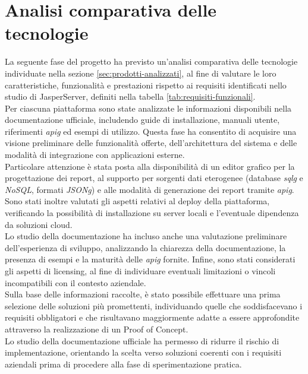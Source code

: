 \section{Analisi comparativa delle tecnologie}
\label{sec:analisi-comparativa-tecnologie}
    La seguente fase del progetto ha previsto un'analisi comparativa delle tecnologie individuate nella sezione \ref{sec:prodotti-analizzati}, al fine di valutare le loro caratteristiche, funzionalità e prestazioni rispetto ai requisiti identificati nello studio di JasperServer, definiti nella tabella \ref{tab:requisiti-funzionali}.\\
    Per ciascuna piattaforma sono state analizzate le informazioni disponibili nella documentazione ufficiale, includendo guide di installazione, manuali utente, riferimenti \emph{\gls{apig}} ed esempi di utilizzo. Questa fase ha consentito di acquisire una visione preliminare delle funzionalità offerte, dell'architettura del sistema e delle modalità di integrazione con applicazioni esterne.\\
    Particolare attenzione è stata posta alla disponibilità di un editor grafico per la progettazione dei report, al supporto per sorgenti dati eterogenee (database \emph{\gls{sqlg}} e \emph{NoSQL}, formati \emph{\gls{JSONg}}) e alle modalità di generazione dei report tramite \emph{\gls{apig}}. Sono stati inoltre valutati gli aspetti relativi al deploy della piattaforma, verificando la possibilità di installazione su server locali e l'eventuale dipendenza da soluzioni cloud.\\
    Lo studio della documentazione ha incluso anche una valutazione preliminare dell'esperienza di sviluppo, analizzando la chiarezza della documentazione, la presenza di esempi e la maturità delle \emph{\gls{apig}} fornite. Infine, sono stati considerati gli aspetti di licensing, al fine di individuare eventuali limitazioni o vincoli incompatibili con il contesto aziendale.\\
    Sulla base delle informazioni raccolte, è stato possibile effettuare una prima selezione delle soluzioni più promettenti, individuando quelle che soddisfacevano i requisiti obbligatori e che risultavano maggiormente adatte a essere approfondite attraverso la realizzazione di un Proof of Concept.\\
    Lo studio della documentazione ufficiale ha permesso di ridurre il rischio di implementazione, orientando la scelta verso soluzioni coerenti con i requisiti aziendali prima di procedere alla fase di sperimentazione pratica.\\
